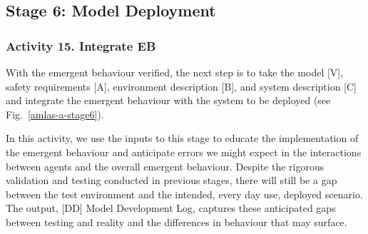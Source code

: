 \documentclass[runningheads]{llncs}
\begin{document}


\subsection{Stage 6: Model Deployment} \label{framework-stage6}

\subsubsection*{Activity 15. Integrate EB}

With the emergent behaviour verified, the next step is to take the model [V], safety requirements [A], environment description [B], and system description [C] and integrate the emergent behaviour with the system to be deployed (see Fig.~\ref{amlas-a-stage6}). 

In this activity, we use the inputs to this stage to educate the implementation of the emergent behaviour and anticipate errors we might expect in the interactions between agents and the overall emergent behaviour. Despite the rigorous validation and testing conducted in previous stages, there will still be a gap between the test environment and the intended, every day use, deployed scenario. The output, [DD] Model Development Log, captures these anticipated gaps between testing and reality and the differences in behaviour that may surface. 
\end{document}
